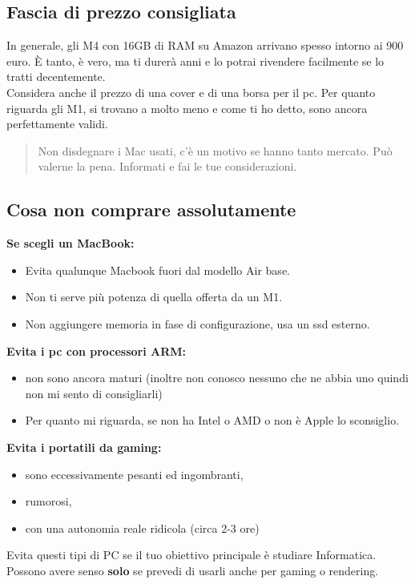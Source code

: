 \documentclass{article}
\begin{document}
\subsection{Fascia di prezzo consigliata}
In generale, gli M4 con 16GB di RAM su Amazon arrivano spesso intorno ai 900 euro.  
È tanto, è vero, ma ti durerà anni e lo potrai rivendere facilmente se lo tratti decentemente.\\
Considera anche il prezzo di una cover e di una borsa per il pc. 
Per quanto riguarda gli M1, si trovano a molto meno e come ti ho detto, sono ancora perfettamente validi. 
\begin{quote}
Non disdegnare i Mac usati, c'è un motivo se hanno tanto mercato. Può valerne la pena. Informati e fai le tue considerazioni.
\end{quote}


\subsection{Cosa non comprare assolutamente}
\textbf{Se scegli un MacBook:}
\begin{itemize}
\item Evita qualunque Macbook fuori dal modello Air base.
\item Non ti serve più potenza di quella offerta da un M1.
\item Non aggiungere memoria in fase di configurazione, usa un ssd esterno.
\end{itemize}%
\textbf{Evita i pc con processori ARM:}
\begin{itemize}
\item non sono ancora maturi (inoltre non conosco nessuno che ne abbia uno quindi non mi sento di consigliarli)
\item Per quanto mi riguarda, se non ha Intel o AMD o non è Apple lo sconsiglio.
\end{itemize}%
\textbf{Evita i portatili da gaming:}
\begin{itemize}
\item sono eccessivamente pesanti ed ingombranti,
\item rumorosi,
\item con una autonomia reale ridicola (circa 2-3 ore)
\end{itemize}%
Evita questi tipi di PC se il tuo obiettivo principale è studiare Informatica. Possono avere senso \textbf{solo} se prevedi di usarli anche per gaming o rendering.
\end{document}
